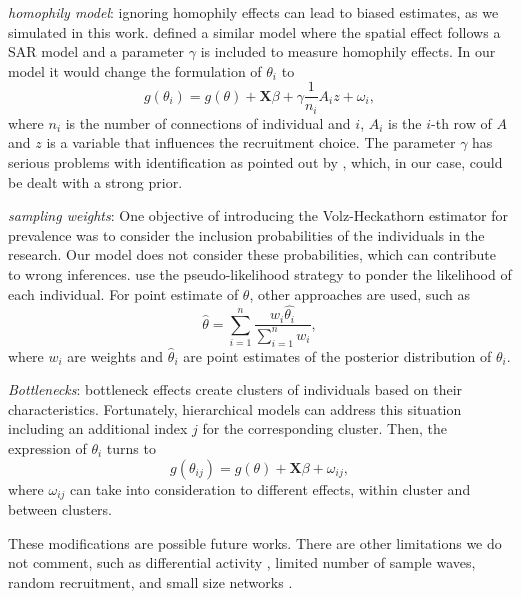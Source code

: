 \begin{alineas}
  \item {\em homophily model}: ignoring homophily effects can lead to biased 
  estimates, as we simulated in this work. \textcite[p. 9]{yauck2021general} defined a
  similar model where the spatial effect follows a SAR model and a parameter
  $\gamma$ is included to measure homophily effects. In our model it would change the
  formulation of $\theta_i$ to 
  $$
  g(\theta_i) = g(\theta) + \boldsymbol{X} \beta + \gamma\frac{1}{n_i}A_iz + \omega_i,
  $$
  where $n_i$ is the number of connections of individual and $i$, $A_i$ is the
 $i$-th row of $A$ and $z$ is a variable that influences the recruitment
 choice. The parameter $\gamma$ has
  serious problems with identification as pointed out by \textcite[p.
  11]{yauck2021general}, which, in our case, could be dealt with a strong prior.
  \item {\em sampling weights}: One objective of introducing the
  Volz-Heckathorn estimator for prevalence was to consider the inclusion
  probabilities of the individuals in the research. Our model does not
  consider these probabilities, which can contribute to wrong inferences.
  \textcite{bastos2018hiv} use the pseudo-likelihood strategy to ponder the likelihood of each
  individual. For point estimate of $\theta$, other approaches are used, such
  as 
  $$
  \hat{\theta} = \sum_{i=1}^n \frac{w_i \hat{\theta_i}}{\sum_{i=1}^n w_i},
  $$
  where $w_i$ are weights and $\hat{\theta}_i$ are point estimates of the
  posterior distribution of $\theta_i$. 
  \item {\em Bottlenecks}: bottleneck effects create clusters of individuals 
  based on their characteristics. Fortunately, hierarchical models can address
  this situation including an additional index $j$ for the corresponding
  cluster. Then, the expression of $\theta_i$ turns to
  $$
  g(\theta_{ij}) = g(\theta) + \boldsymbol{X}\beta + \omega_{ij},
  $$
  where $\omega_{ij}$ can take into consideration to different effects, within
  cluster and between clusters. 
\end{alineas}

These modifications are possible future works. There are other limitations we do not comment, such as differential activity
\cite[p. 68]{gile2018methods}, limited number of sample waves, random
recruitment, and small size networks \cite{gile2015diagnostics}.